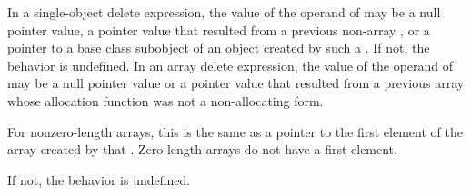 \pnum
{}%
In a single-object delete expression, the value of the operand of
 may be a null pointer value,
a pointer value
that resulted from a previous non-array , or
a pointer to a base class subobject
of an object created by such a .
If not, the behavior is undefined.
%
%
%
%
%
%
In an array delete expression, the value of the operand of 
may be a null pointer value or a pointer value that resulted from
a previous array  whose
allocation function was not a non-allocating form.
\begin{footnote}
For nonzero-length
arrays, this is the same as a pointer to the first
element of the array created by that .
Zero-length arrays do not have a first element.
\end{footnote}
If not, the behavior is undefined.
%
%
%
